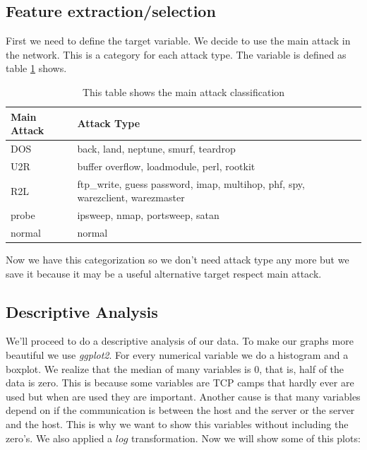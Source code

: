 \documentclass[a4paper]{article} %
\begin{document}
\subsection{Feature extraction/selection}
First we need to define the target variable. We decide to use the main attack in the network. This is a category for each attack type. The variable is defined as table \ref{table:main} shows. 
\begin{table}
	\begin{tabular}{ll}
		Main Attack & Attack Type                                                            \\ \hline
		DOS         & back, land, neptune, smurf, teardrop                                       \\
		U2R         & buffer overflow, loadmodule, perl, rootkit                               \\
		R2L         & ftp\_write, guess password, imap, multihop, phf, spy, warezclient, warezmaster \\
		probe       & ipsweep, nmap, portsweep, satan                                           \\
		normal      & normal                                                                 \\
	\end{tabular}
	\caption{This table shows the main attack classification}
	\label{table:main}
	
\end{table}
Now we have this categorization so we don't need attack type any more but we save it because it may be a useful alternative target respect main attack. 


\subsection{Descriptive Analysis}
We'll proceed to do a descriptive analysis of our data. To make our graphs more beautiful we use \textit{ggplot2}\cite{ggplot}. For every numerical variable we do a histogram and a boxplot. We realize that the median of many variables is 0, that is, half of the data is zero. This is because some variables are TCP camps that hardly ever are used but when are used they are important. Another cause is that many variables depend on if the communication is between the host and the server or the server and the host. This is why we want to show this variables without including the zero's. We also applied a $log$ transformation. Now we will show some of this plots:\\
\end{document}
